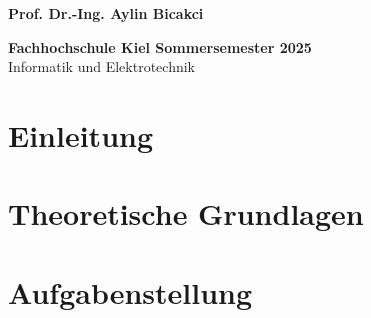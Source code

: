 \documentclass[12pt,a4paper,ngerman,captions=tableheading]{scrartcl}
\begin{document}
\begin{titlepage}
    \vspace{0.2cm}
    
\large \textbf{Prof. Dr.-Ing. Aylin Bicakci }

    \vspace{0.3cm}

\large \textbf{Fachhochschule Kiel \linebreak Sommersemester 2025\\}
{\large Informatik und Elektrotechnik}

\vfill
\end{titlepage}


\newpage


\tableofcontents  
\newpage


\section{Einleitung}




\section{Theoretische Grundlagen}



\section{Aufgabenstellung}


\end{document}
